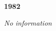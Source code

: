 \begin{center}
  \Huge
  \textbf{1982}
\end{center}

\begin{center}
  \textit{No information}
\end{center}

\vspace{50mm}

\pagebreak
